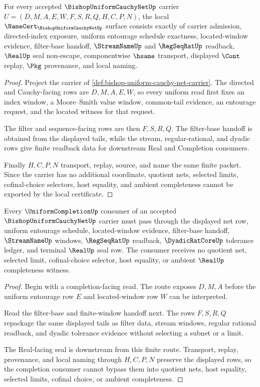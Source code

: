 \begin{theorem}
\label{thm:bishop-uniform-cauchy-net-namecert-obligations}
For every accepted $\BishopUniformCauchyNetUp$ carrier $U=(D,M,A,E,W,F,S,R,Q,H,C,P,N)$, the local $\NameCert_{\BishopUniformCauchyNetUp}$ surface consists exactly of carrier admission, directed-index exposure, uniform entourage schedule exactness, located-window evidence, filter-base handoff, $\StreamNameUp$ and $\RegSeqRatUp$ readback, $\RealUp$ seal non-escape, componentwise $\hsame$ transport, displayed $\Cont$ replay, $\Pkg$ provenance, and local naming.
\end{theorem}
\begin{proof}
Project the carrier of \autoref{def:bishop-uniform-cauchy-net-carrier}. The directed and Cauchy-facing rows are $D,M,A,E,W$, so every uniform read first fixes an index window, a Moore--Smith value window, common-tail evidence, an entourage request, and the located witness for that request.

The filter and sequence-facing rows are then $F,S,R,Q$. The filter-base handoff is obtained from the displayed tails, while the stream, regular-rational, and dyadic rows give finite readback data for downstream Real and Completion consumers.

Finally $H,C,P,N$ transport, replay, source, and name the same finite packet. Since the carrier has no additional coordinate, quotient nets, selected limits, cofinal-choice selectors, host equality, and ambient completeness cannot be exported by the local certificate.
\end{proof}

\begin{theorem}
\label{thm:bishop-uniform-cauchy-net-completion-route}
Every $\UniformCompletionUp$ consumer of an accepted $\BishopUniformCauchyNetUp$ carrier must pass through the displayed net row, uniform entourage schedule, located-window evidence, filter-base handoff, $\StreamNameUp$ windows, $\RegSeqRatUp$ readback, $\DyadicRatCoreUp$ tolerance ledger, and terminal $\RealUp$ seal row. The consumer receives no quotient net, selected limit, cofinal-choice selector, host equality, or ambient $\RealUp$ completeness witness.
\end{theorem}
\begin{proof}
Begin with a completion-facing read. The route exposes $D,M,A$ before the uniform entourage row $E$ and located-window row $W$ can be interpreted.

Read the filter-base and finite-window handoff next. The rows $F,S,R,Q$ repackage the same displayed tails as filter data, stream windows, regular rational readback, and dyadic tolerance evidence without selecting a subnet or a limit.

The Real-facing seal is downstream from this finite route. Transport, replay, provenance, and local naming through $H,C,P,N$ preserve the displayed rows, so the completion consumer cannot bypass them into quotient nets, host equality, selected limits, cofinal choice, or ambient completeness.
\end{proof}

